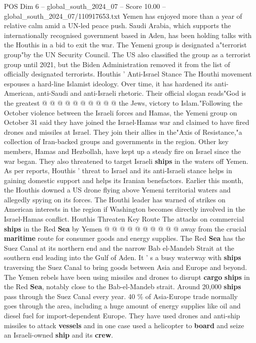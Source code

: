 \begin{textsample}{POS Dim 6 – global\_south\_2024\_07 – Score 10.00 – global\_south\_2024\_07/110917653.txt}
Yemen has enjoyed more than a year of relative calm amid a UN-led peace push.
Saudi Arabia, which supports the internationally recognised government based in Aden, has been holding talks with the Houthis in a bid to exit the war.
The Yemeni group is designated a"terrorist group"by the UN Security Council.
The US also classified the group as a terrorist group until 2021, but the Biden Administration removed it from the list of officially designated terrorists.
Houthis ' Anti-Israel Stance The Houthi movement espouses a hard-line Islamist ideology.
Over time, it has hardened its anti-American, anti-Saudi and anti-Israeli rhetoric.
Their official slogan reads"God is the greatest @ @ @ @ @ @ @ @ @ @ the Jews, victory to Islam."Following the October violence between the Israeli forces and Hamas, the Yemeni group on October 31 said they have joined the Israel-Hamas war and claimed to have fired drones and missiles at Israel.
They join their allies in the"Axis of Resistance,"a collection of Iran-backed groups and governments in the region.
Other key members, Hamas and Hezbollah, have kept up a steady fire on Israel since the war began.
They also threatened to target Israeli \textbf{ships} in the waters off Yemen.
As per reports, Houthis ' threat to Israel and its anti-Israeli stance helps in gaining domestic support and helps its Iranian benefactors.
Earlier this month, the Houthis downed a US drone flying above Yemeni territorial waters and allegedly spying on its forces.
The Houthi leader has warned of strikes on American interests in the region if Washington becomes directly involved in the Israel-Hamas conflict.
Houthis Threaten Key Route The attacks on commercial \textbf{ships} in the Red \textbf{Sea} by Yemen @ @ @ @ @ @ @ @ @ @ away from the crucial \textbf{maritime} route for consumer goods and energy supplies.
The Red \textbf{Sea} has the Suez Canal at its northern end and the narrow Bab el-Mandeb Strait at the southern end leading into the Gulf of Aden.
It ' s a busy waterway with \textbf{ships} traversing the Suez Canal to bring goods between Asia and Europe and beyond.
The Yemen rebels have been using missiles and drones to disrupt \textbf{cargo} \textbf{ships} in the Red \textbf{Sea}, notably close to the Bab-el-Mandeb strait.
Around 20,000 \textbf{ships} pass through the Suez Canal every year. 40 \% of Asia-Europe trade normally goes through the area, including a huge amount of energy supplies like oil and diesel fuel for import-dependent Europe.
They have used drones and anti-ship missiles to attack \textbf{vessels} and in one case used a helicopter to \textbf{board} and seize an Israeli-owned \textbf{ship} and its \textbf{crew}.

\end{textsample}
